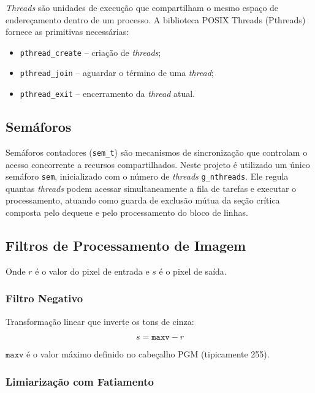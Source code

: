\documentclass[12 pt]{abntex2}
\begin{document}
\textit{Threads} são unidades de execução que compartilham o mesmo espaço de
endereçamento dentro de um processo. A biblioteca POSIX Threads (Pthreads)
fornece as primitivas necessárias:
 
\begin{itemize}
  \item \texttt{pthread\_create} -- criação de \textit{threads};
  \item \texttt{pthread\_join} -- aguardar o término de uma \textit{thread};
  \item \texttt{pthread\_exit} -- encerramento da \textit{thread} atual.
\end{itemize}
 
\subsection{Semáforos}
 
Semáforos contadores (\texttt{sem\_t}) são mecanismos de sincronização que
controlam o acesso concorrente a recursos compartilhados. Neste projeto é
utilizado um único semáforo \texttt{sem}, inicializado com o número de
\textit{threads} \texttt{g\_nthreads}. Ele regula quantas \textit{threads}
podem acessar simultaneamente a fila de tarefas e executar o processamento,
atuando como guarda de exclusão mútua da seção crítica composta pelo
dequeue e pelo processamento do bloco de linhas.
 
\subsection{Filtros de Processamento de Imagem}
 
Onde $r$ é o valor do pixel de entrada e $s$ é o pixel de saída.

\subsubsection{Filtro Negativo}

Transformação linear que inverte os tons de cinza:

\begin{equation}
  s = \mathtt{maxv} - r
\end{equation}

$\mathtt{maxv}$ é o valor máximo definido no cabeçalho PGM (tipicamente 255).

\subsubsection{Limiarização com Fatiamento}
 
\end{document}
